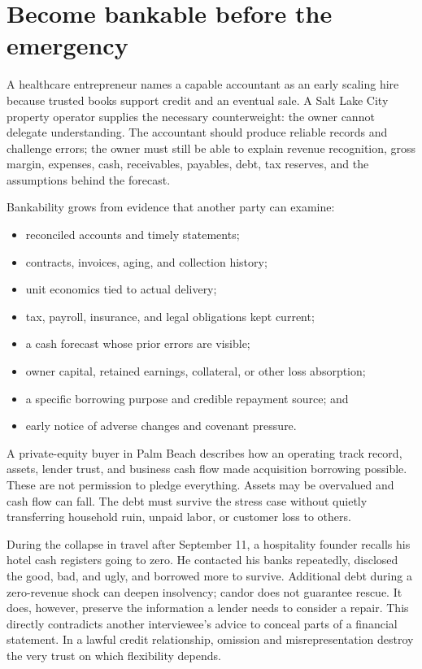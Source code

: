 \section{Become bankable before the emergency}

A healthcare entrepreneur names a capable accountant as an early scaling hire
because trusted books support credit and an eventual sale. A Salt Lake City
property operator supplies the necessary counterweight: the owner cannot
delegate understanding. The accountant should produce reliable records and
challenge errors; the owner must still be able to explain revenue recognition,
gross margin, expenses, cash, receivables, payables, debt, tax reserves, and the
assumptions behind the forecast.

Bankability grows from evidence that another party can examine:

\begin{itemize}[leftmargin=1.5em,itemsep=0.15em]
\item reconciled accounts and timely statements;
\item contracts, invoices, aging, and collection history;
\item unit economics tied to actual delivery;
\item tax, payroll, insurance, and legal obligations kept current;
\item a cash forecast whose prior errors are visible;
\item owner capital, retained earnings, collateral, or other loss absorption;
\item a specific borrowing purpose and credible repayment source; and
\item early notice of adverse changes and covenant pressure.
\end{itemize}

A private-equity buyer in Palm Beach describes how an operating track record,
assets, lender trust, and business cash flow made acquisition borrowing
possible. These are not permission to pledge everything. Assets may be
overvalued and cash flow can fall. The debt must survive the stress case without
quietly transferring household ruin, unpaid labor, or customer loss to others.

During the collapse in travel after September 11, a hospitality founder recalls
his hotel cash registers going to zero. He contacted his banks repeatedly, disclosed
the good, bad, and ugly, and borrowed more to survive. Additional debt during a
zero-revenue shock can deepen insolvency; candor does not guarantee rescue. It
does, however, preserve the information a lender needs to consider a repair.
This directly contradicts another interviewee's advice to conceal parts of a
financial statement. In a lawful credit relationship, omission and
misrepresentation destroy the very trust on which flexibility depends.

